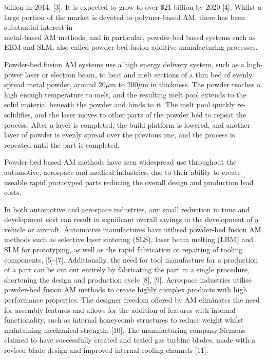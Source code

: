 \documentclass[10pt]{article}
\begin{document}
billion in 2014, [3]. It is expected to grow to over $\$ 21$ billion by 2020 [4]. Whilst a large portion of the market is devoted to polymer-based AM, there has been substantial interest in\\
metal-based AM methods, and in particular, powder-bed based systems such as EBM and SLM, also called powder-bed fusion additive manufacturing processes.

Powder-bed fusion AM systems use a high energy delivery system, such as a high-power laser or electron beam, to heat and melt sections of a thin bed of evenly spread metal powder, around $20 \mu \mathrm{m}$ to $200 \mu \mathrm{m}$ in thickness. The powder reaches a high enough temperature to melt, and the resulting melt pool extends to the solid material beneath the powder and binds to it. The melt pool quickly re-solidifies, and the laser moves to other parts of the powder bed to repeat the process. After a layer is completed, the build platform is lowered, and another layer of powder is evenly spread over the previous one, and the process is repeated until the part is completed.

Powder-bed based AM methods have seen widespread use throughout the automotive, aerospace and medical industries, due to their ability to create useable rapid prototyped parts reducing the overall design and production lead costs.

In both automotive and aerospace industries, any small reduction in time and development cost can result in significant overall savings in the development of a vehicle or aircraft. Automotive manufactures have utilised powder-bed fusion AM methods such as selective laser sintering (SLS), laser beam melting (LBM) and SLM for prototyping, as well as the rapid fabrication or repairing of tooling components, [5]-[7]. Additionally, the need for tool manufacture for a production of a part can be cut out entirely by fabricating the part in a single procedure, shortening the design and production cycle [8], [9]. Aerospace industries utilise powder-bed fusion AM methods to create highly complex products with high performance properties. The designer freedom offered by AM eliminates the need for assembly features and allows for the addition of features with internal functionality, such as internal honeycomb structures to reduce weight whilst maintaining mechanical strength, [10]. The manufacturing company Siemens claimed to have successfully created and tested gas turbine blades, made with a revised blade design and improved internal cooling channels [11].
\end{document}
